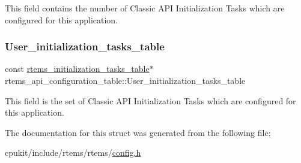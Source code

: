 This field contains the number of Classic A\+PI Initialization Tasks which are configured for this application. \mbox{\label{structrtems__api__configuration__table_a776059a5622c1486b36fa36b8821b2b1}} 
\subsubsection{\texorpdfstring{User\_initialization\_tasks\_table}{User\_initialization\_tasks\_table}}
{\footnotesize\ttfamily const \mbox{\hyperlink{structrtems__initialization__tasks__table}{rtems\+\_\+initialization\+\_\+tasks\+\_\+table}}$\ast$ rtems\+\_\+api\+\_\+configuration\+\_\+table\+::\+User\+\_\+initialization\+\_\+tasks\+\_\+table}

This field is the set of Classic A\+PI Initialization Tasks which are configured for this application. 

The documentation for this struct was generated from the following file\+:\begin{DoxyCompactItemize}
\item 
cpukit/include/rtems/rtems/\mbox{\hyperlink{include_2rtems_2rtems_2config_8h}{config.\+h}}\end{DoxyCompactItemize}
